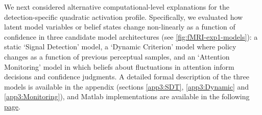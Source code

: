 \documentclass[12pt,twoside]{reedthesis}
\begin{document}
We next considered alternative computational-level explanations for the detection-specific quadratic activation profile. Specifically, we evaluated how latent model variables or belief states change non-linearly as a function of confidence in three candidate model architectures (see \ref{fig:fMRI-exp1-models}): a static `Signal Detection' model, a `Dynamic Criterion' model where policy changes as a function of previous perceptual samples, and an `Attention Monitoring' model in which beliefs about fluctuations in attention inform decisions and confidence judgments. A detailed formal description of the three models is available in the appendix (sections \ref{app3:SDT}, \ref{app3:Dynamic} and \ref{app3:Monitoring}), and Matlab implementations are available in the following \href{https://github.com/matanmazor/detectionVsDiscrimination_fMRI/blob/master/simulation/simulations.mlx}{page}.
\end{document}
